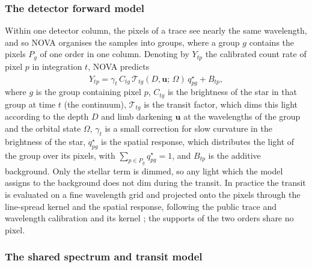 \subsubsection{The detector forward model}

Within one detector column, the pixels of a trace see nearly the same
wavelength, and so NOVA organises the samples into groups, where a group $g$
contains the pixels $P_g$ of one order in one column. Denoting by $Y_{tp}$
the calibrated count rate of pixel $p$ in integration $t$, NOVA predicts
\begin{equation}
 \widehat Y_{tp}
 = \gamma_t\, C_{tg}\,
   \mathcal{T}_{tg}(D, \bm{u};\, \Omega)\,
   q^\star_{pg}
 + B_{tp},
 \label{eq:nova-forward}
\end{equation}
where $g$ is the group containing pixel $p$, $C_{tg}$ is the brightness of
the star in that group at time $t$ (the continuum), $\mathcal{T}_{tg}$ is the
transit factor, which dims this light according to the depth $D$ and limb
darkening $\bm{u}$ at the wavelengths of the group and the orbital state
$\Omega$, $\gamma_t$ is a small correction for slow curvature in the
brightness of the star, $q^\star_{pg}$ is the spatial response, which
distributes the light of the group over its pixels, with
$\sum_{p\in P_g} q^\star_{pg}=1$, and $B_{tp}$ is the additive background.
Only the stellar term is dimmed, so any light which the model assigns to the
background does not dim during the transit. In practice the transit is evaluated on
a fine wavelength grid and projected onto the pixels through the
line-spread kernel and the spatial response, following the public trace and
wavelength calibration \citep{BainesEtAl2023Trace,BainesEtAl2023Wavelength}
and its kernel \citep{DarveauBernierEtAl2022,JWSTPipeline2025}; the supports
of the two orders share no pixel.

\subsubsection{The shared spectrum and transit model}

